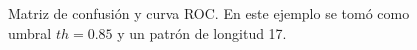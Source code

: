 \begin{figure}
	\centering
	\caption{Matriz de confusión y curva ROC. En este ejemplo se tomó como umbral $th=0.85$ y un patrón de longitud 17.} \label{fig:1d-experiment-085}
\end{figure}

